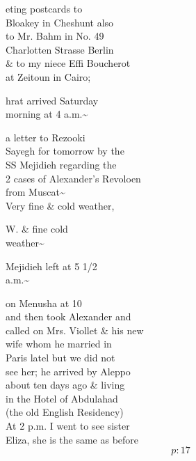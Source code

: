 \documentclass{report}
\begin{document}


	\par{
 	eting postcards to\ \\Bloakey in Cheshunt also\ \\to Mr. Bahm in No. 49\ \\Charlotten Strasse Berlin\ \\\& to my niece Effi Boucherot\ \\at Zeitoun in Cairo;\ \\
	}

	\par{
 	hrat arrived Saturday\ \\morning at 4 a.m.\~{}\ \\
	}

	\par{
 	a letter to Rezooki\ \\Sayegh for tomorrow by the\ \\SS Mejidieh regarding the\ \\2 cases of Alexander's Revoloen\ \\from Muscat\~{}\ \\Very fine \& cold weather,\ \\
	}


	\par{
 	W. \& fine cold\ \\weather\~{}\ \\
	}

	\par{
 	Mejidieh left at 5 1/2\ \\a.m.\~{}\ \\
	}

	\par{
 	on Menusha at 10\ \\and then took Alexander and\ \\called on Mrs. Viollet \& his new\ \\wife whom he married in\ \\Paris latel but we did not\ \\see her; he arrived by Aleppo\ \\about ten days ago \& living\ \\in the Hotel of Abdulahad\ \\(the old English Residency)\ \\At 2 p.m. I went to see sister\ \\Eliza, she is the same as before\ \\
  \[p: 17 \]

	}
\end{document}
